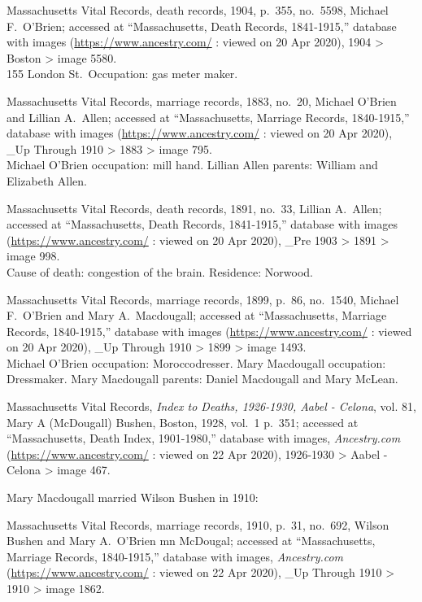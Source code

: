 \begin{thebibliography}{99}
	Massachusetts Vital Records, death records, 1904, p.\ 355, no.\ 5598, Michael F.\ O'Brien; accessed at ``Massachusetts, Death Records, 1841-1915,'' database with images (\url{https://www.ancestry.com/} : viewed on 20 Apr 2020), 1904 > Boston > image 5580.\\
	155 London St.\ Occupation: gas meter maker.
	
	Massachusetts Vital Records, marriage records, 1883, no.\ 20, Michael O'Brien and Lillian A.\ Allen; accessed at ``Massachusetts, Marriage Records, 1840-1915,'' database with images (\url{https://www.ancestry.com/} : viewed on 20 Apr 2020), \_Up Through 1910 > 1883 > image 795.\\
	Michael O'Brien occupation: mill hand. Lillian Allen parents: William and Elizabeth Allen.
	
	Massachusetts Vital Records, death records, 1891, no.\ 33, Lillian A.\ Allen; accessed at ``Massachusetts, Death Records, 1841-1915,'' database with images (\url{https://www.ancestry.com/} : viewed on 20 Apr 2020), \_Pre 1903 > 1891 > image 998.\\
	Cause of death: congestion of the brain. Residence: Norwood.
	
	Massachusetts Vital Records, marriage records, 1899, p.\ 86, no.\ 1540, Michael F.\ O'Brien and Mary A.\ Macdougall; accessed at ``Massachusetts, Marriage Records, 1840-1915,'' database with images (\url{https://www.ancestry.com/} : viewed on 20 Apr 2020), \_Up Through 1910 > 1899 > image 1493.\\
	Michael O'Brien occupation: Moroccodresser. Mary Macdougall occupation: Dressmaker. Mary Macdougall parents: Daniel Macdougall and Mary McLean.
	
	Massachusetts Vital Records, \textit{Index to Deaths, 1926-1930, Aabel - Celona}, vol. 81, Mary A (McDougall) Bushen, Boston, 1928, vol.\ 1 p.\ 351; accessed at ``Massachusetts, Death Index, 1901-1980,'' database with images, \textit{Ancestry.com} (\url{https://www.ancestry.com/} : viewed on 22 Apr 2020), 1926-1930 > Aabel - Celona > image 467.
	
	Mary Macdougall married Wilson Bushen in 1910:
	
	Massachusetts Vital Records, marriage records, 1910, p.\ 31, no.\ 692, Wilson Bushen and Mary A.\ O'Brien mn McDougal; accessed at ``Massachusetts, Marriage Records, 1840-1915,'' database with images, \textit{Ancestry.com} (\url{https://www.ancestry.com/} : viewed on 22 Apr 2020), \_Up Through 1910 > 1910 > image 1862.
	

\end{thebibliography}
